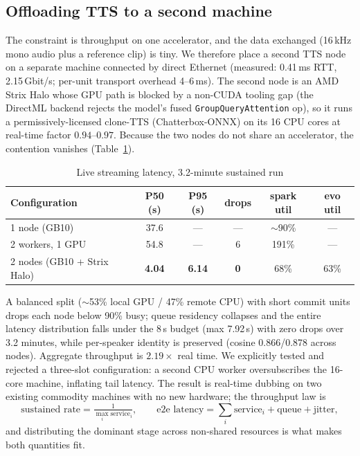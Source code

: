 \documentclass[11pt,a4paper]{article}
\begin{document}
\subsection{Offloading TTS to a second machine}

The constraint is throughput on one accelerator, and the data exchanged (16\,kHz mono audio plus a reference clip) is tiny. We therefore place a second TTS node on a separate machine connected by direct Ethernet (measured: 0.41\,ms RTT, 2.15\,Gbit/s; per-unit transport overhead 4--6\,ms). The second node is an AMD Strix Halo whose GPU path is blocked by a non-CUDA tooling gap (the DirectML backend rejects the model's fused \texttt{GroupQueryAttention} op), so it runs a permissively-licensed clone-TTS (Chatterbox-ONNX) on its 16 CPU cores at real-time factor $0.94$--$0.97$. Because the two nodes do not share an accelerator, the contention vanishes (Table~\ref{tab:dist}).

\begin{table}[H]
\centering
\caption{Live streaming latency, 3.2-minute sustained run}
\label{tab:dist}
\begin{tabular}{lccccc}
\toprule
Configuration & P50 (s) & P95 (s) & drops & spark util & evo util \\
\midrule
1 node (GB10) & 37.6 & --- & --- & $\sim$90\% & --- \\
2 workers, 1 GPU & 54.8 & --- & 6 & 191\% & --- \\
2 nodes (GB10 + Strix Halo) & \textbf{4.04} & \textbf{6.14} & \textbf{0} & 68\% & 63\% \\
\bottomrule
\end{tabular}
\end{table}

A balanced split ($\sim$53\% local GPU / 47\% remote CPU) with short commit units drops each node below 90\% busy; queue residency collapses and the entire latency distribution falls under the 8\,s budget (max 7.92\,s) with zero drops over 3.2 minutes, while per-speaker identity is preserved (cosine 0.866/0.878 across nodes). Aggregate throughput is $2.19\times$ real time. We explicitly tested and rejected a three-slot configuration: a second CPU worker oversubscribes the 16-core machine, inflating tail latency. The result is real-time dubbing on two existing commodity machines with no new hardware; the throughput law is
\[
\text{sustained rate} = \tfrac{1}{\max_i \text{service}_i}, \qquad
\text{e2e latency} = \sum_i \text{service}_i + \text{queue} + \text{jitter},
\]
and distributing the dominant stage across non-shared resources is what makes both quantities fit.
\end{document}
